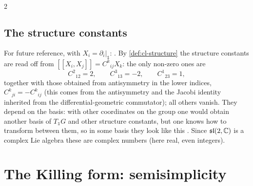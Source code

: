 \begin{paracol}{2}
\subsection{The structure constants}\label{sec:sa-structure}
For future reference, with $X_i=\partial_i|_{\mathbb 1}$:    . By \cref{def:cl-structure} the structure constants are read off from $[\![X_i,X_j]\!]=C^k{}_{ij}X_k$: the only non-zero ones are
\[
  C^2{}_{12}=2,\qquad C^3{}_{13}=-2,\qquad C^1{}_{23}=1,
\]
together with those obtained from antisymmetry in the lower indices, $C^k{}_{ji}=-C^k{}_{ij}$ (this comes from the antisymmetry and the Jacobi identity inherited from the differential-geometric commutator); all others vanish. They depend on the basis: with other coordinates on the group one would obtain another basis of $T_{\mathbb 1}G$ and other structure constants, but one knows how to transform between them, so in some basis they look like this      . Since $\mathfrak{sl}(2,\mathbb{C})$ is a complex Lie algebra these are complex numbers (here real, even integers).

\section{The Killing form: semisimplicity}\label{sec:sa-killing}


\end{paracol}
